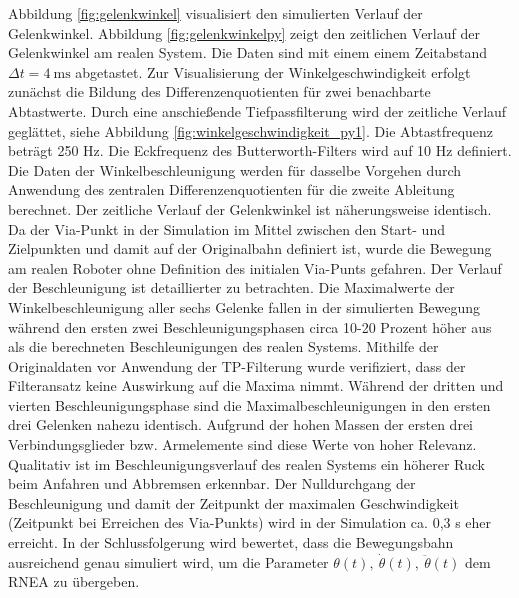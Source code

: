 Abbildung \ref{fig:gelenkwinkel}  visualisiert den simulierten  Verlauf der Gelenkwinkel. Abbildung \ref{fig:gelenkwinkelpy} zeigt den zeitlichen Verlauf der Gelenkwinkel am realen System. Die Daten sind mit einem einem  Zeitabstand $\Delta t = 4~\text{ms}$ abgetastet. Zur Visualisierung der Winkelgeschwindigkeit  erfolgt zunächst die Bildung des Differenzenquotienten für zwei benachbarte Abtastwerte. Durch eine anschießende Tiefpassfilterung wird der zeitliche Verlauf geglättet, siehe Abbildung \ref{fig:winkelgeschwindigkeit_py1}. Die Abtastfrequenz beträgt 250 Hz. Die Eckfrequenz des Butterworth-Filters wird auf 10 Hz definiert. Die Daten der Winkelbeschleunigung werden für dasselbe Vorgehen durch Anwendung des zentralen Differenzenquotienten für die zweite Ableitung berechnet. Der zeitliche Verlauf der Gelenkwinkel ist näherungsweise identisch. Da der Via-Punkt in der Simulation im Mittel zwischen den Start- und Zielpunkten und damit auf der Originalbahn definiert ist, wurde die Bewegung am realen Roboter ohne Definition des initialen Via-Punts gefahren. Der Verlauf der Beschleunigung ist detaillierter zu betrachten. Die Maximalwerte der Winkelbeschleunigung aller sechs Gelenke fallen in der simulierten Bewegung während den ersten zwei Beschleunigungsphasen circa 10-20 Prozent höher aus als die berechneten Beschleunigungen des realen Systems. Mithilfe der Originaldaten vor Anwendung der TP-Filterung wurde verifiziert, dass der Filteransatz keine Auswirkung auf die Maxima nimmt. Während der dritten und vierten Beschleunigungsphase sind die Maximalbeschleunigungen in den ersten drei Gelenken nahezu identisch. Aufgrund der hohen  Massen der ersten drei Verbindungsglieder bzw. Armelemente sind diese Werte von hoher Relevanz. Qualitativ ist im Beschleunigungsverlauf des realen Systems ein höherer Ruck beim Anfahren und Abbremsen erkennbar. Der Nulldurchgang der Beschleunigung und damit der Zeitpunkt der maximalen Geschwindigkeit (Zeitpunkt bei Erreichen des Via-Punkts) wird in der Simulation ca. 0,3 s eher erreicht. In der Schlussfolgerung wird bewertet, dass die Bewegungsbahn ausreichend genau simuliert wird, um die Parameter  $\theta(t), ~\dot{\theta}(t), ~\ddot{\theta}(t)$ dem RNEA zu übergeben. 

